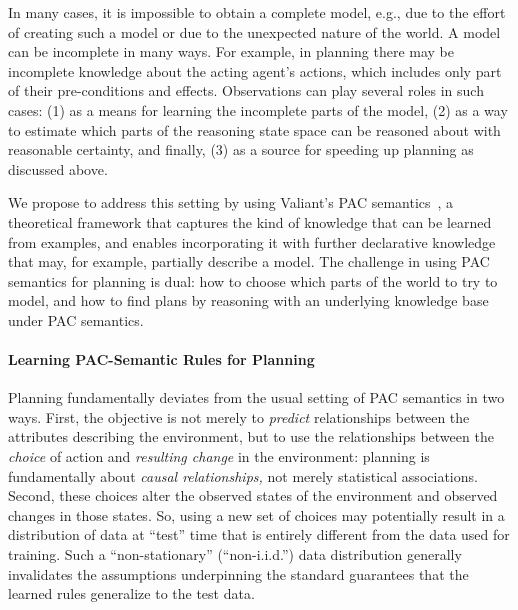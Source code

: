 \documentclass[12pt]{article}
\begin{document}
In many cases, it is impossible to obtain a complete model, e.g., due to the effort of creating such a model or due to the unexpected nature of the world. A model can be incomplete in many ways. For example, in planning there may be incomplete knowledge about the acting agent's actions, which includes only part of their pre-conditions and effects. Observations can play several roles in such cases: (1) as a means for learning the incomplete parts of the model, (2) as a way to estimate which parts of the reasoning state space can be reasoned about with reasonable certainty, and finally, (3) as a source for speeding up planning as discussed above. 







We propose to address this setting by using Valiant's PAC semantics~\cite{valiant2000robustLogics}, a theoretical framework that captures the kind of knowledge that can be learned from examples, and enables incorporating it with further declarative knowledge that may, for example, partially describe a model. The challenge in  using PAC semantics for planning is dual: how to choose which parts of the world to try to model, and how to find plans by reasoning with an underlying knowledge base under PAC semantics. 









\paragraph{Learning PAC-Semantic Rules for Planning}
Planning fundamentally deviates from the usual setting of PAC semantics in two ways. First, the objective is not merely to {\em predict} relationships between the attributes describing the environment, but to use the relationships between the {\em choice} of action and {\em resulting change} in the environment: planning is fundamentally about {\em causal relationships,} not merely statistical associations. Second, these choices alter the observed states of the environment and observed changes in those states. So, using a new set of choices may potentially result in a distribution of data at ``test'' time that is entirely different from the data used for training. Such a ``non-stationary'' (``non-i.i.d.'') data distribution generally invalidates the assumptions underpinning the standard guarantees that the learned rules generalize to the test data.
\end{document}
